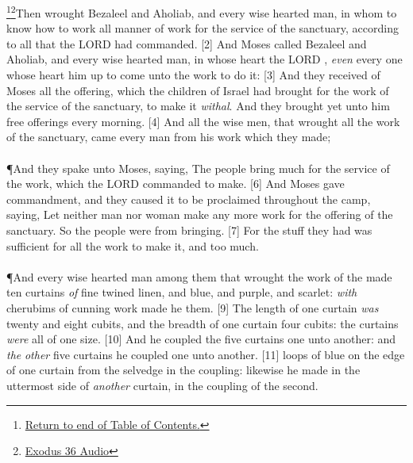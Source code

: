 \footnote{\textcolor[cmyk]{0.99998,1,0,0}{\hyperlink{TOC}{Return to end of Table of Contents.}}}\footnote{\href{https://audiobible.com/bible/exodus_36.html}{\textcolor[cmyk]{0.99998,1,0,0}{Exodus 36 Audio}}}\textcolor[cmyk]{0.99998,1,0,0}{Then wrought Bezaleel and Aholiab, and every wise hearted man, in whom  to know how to work all manner of work for the service of the sanctuary, according to all that the LORD had commanded.}
[2] \textcolor[cmyk]{0.99998,1,0,0}{And Moses called Bezaleel and Aholiab, and every wise hearted man, in whose heart the LORD , \emph{even} every one whose heart  him up to come unto the work to do it:}
[3] \textcolor[cmyk]{0.99998,1,0,0}{And they received of Moses all the offering, which the children of Israel had brought for the work of the service of the sanctuary, to make it \emph{withal}. And they brought yet unto him free offerings every morning.}
[4] \textcolor[cmyk]{0.99998,1,0,0}{And all the wise men, that wrought all the work of the sanctuary, came every man from his work which they made;}\\
\\
\P \textcolor[cmyk]{0.99998,1,0,0}{And they spake unto Moses, saying, The people bring much   for the service of the work, which the LORD commanded to make.}
[6] \textcolor[cmyk]{0.99998,1,0,0}{And Moses gave commandment, and they caused it to be proclaimed throughout the camp, saying, Let neither man nor woman make any more work for the offering of the sanctuary. So the people were  from bringing.}
[7] \textcolor[cmyk]{0.99998,1,0,0}{For the stuff they had was sufficient for all the work to make it, and too much.}\\
\\
\P \textcolor[cmyk]{0.99998,1,0,0}{And every wise hearted man among them that wrought the work of the  made ten curtains \emph{of} fine twined linen, and blue, and purple, and scarlet: \emph{with} cherubims of cunning work made he them.}
[9] \textcolor[cmyk]{0.99998,1,0,0}{The length of one curtain \emph{was} twenty and eight cubits, and the breadth of one curtain four cubits: the curtains \emph{were} all of one size.}
[10] \textcolor[cmyk]{0.99998,1,0,0}{And he coupled the five curtains one unto another: and \emph{the} \emph{other} five curtains he coupled one unto another.}
[11] \textcolor[cmyk]{0.99998,1,0,0}{ loops of blue on the edge of one curtain from the selvedge in the coupling: likewise he made in the uttermost side of \emph{another} curtain, in the coupling of the second.}
